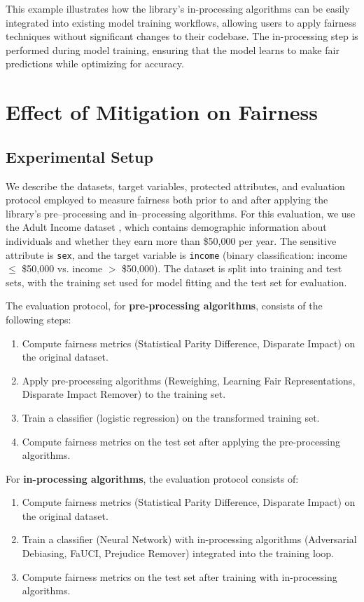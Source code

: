 \documentclass[12pt,a4paper,openright,twoside]{book}
\begin{document}
This example illustrates how the library's in-processing algorithms can be easily integrated into existing model training workflows, allowing users to apply fairness techniques without significant changes to their codebase. The in-processing step is performed during model training, ensuring that the model learns to make fair predictions while optimizing for accuracy.

\section{Effect of Mitigation on Fairness}
\subsection{Experimental Setup}
We describe the datasets, target variables, protected attributes, and evaluation protocol employed to measure fairness both prior to and after applying the library's pre--processing and in--processing algorithms. For this evaluation, we use the Adult Income dataset \cite{adultDataset}, which contains demographic information about individuals and whether they earn more than \$50,000 per year. The sensitive attribute is \texttt{sex}, and the target variable is \texttt{income} (binary classification: income $\leq$ \$50,000 vs. income $>$ \$50,000). The dataset is split into training and test sets, with the training set used for model fitting and the test set for evaluation.

The evaluation protocol, for \textbf{pre-processing algorithms}, consists of the following steps:
\begin{enumerate}
    \item Compute fairness metrics (Statistical Parity Difference, Disparate Impact) on the original dataset.
    \item Apply pre-processing algorithms (Reweighing, Learning Fair Representations, Disparate Impact Remover) to the training set.
    \item Train a classifier (logistic regression) on the transformed training set.
    \item Compute fairness metrics on the test set after applying the pre-processing algorithms.
\end{enumerate}

For \textbf{in-processing algorithms}, the evaluation protocol consists of:
\begin{enumerate}
    \item Compute fairness metrics (Statistical Parity Difference, Disparate Impact) on the original dataset.
    \item Train a classifier (Neural Network) with in-processing algorithms (Adversarial Debiasing, FaUCI, Prejudice Remover) integrated into the training loop.
    \item Compute fairness metrics on the test set after training with in-processing algorithms.
\end{enumerate}
\end{document}
